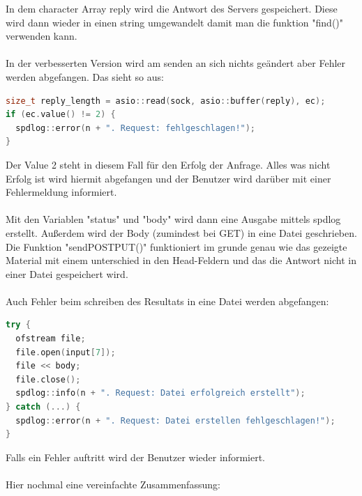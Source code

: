 \documentclass{article}
\begin{document}
In dem character Array reply wird die Antwort des Servers gespeichert. Diese wird dann wieder in einen string umgewandelt damit man die funktion "find()" verwenden kann.
\\
\\
In der verbesserten Version wird am senden an sich nichts geändert aber Fehler werden abgefangen. Das sieht so aus:
\begin{lstlisting}[language=C++]
size_t reply_length = asio::read(sock, asio::buffer(reply), ec);
if (ec.value() != 2) {
  spdlog::error(n + ". Request: fehlgeschlagen!");
}
\end{lstlisting}
Der Value 2 steht in diesem Fall für den Erfolg der Anfrage. Alles was nicht Erfolg ist wird hiermit abgefangen und der Benutzer wird darüber mit einer Fehlermeldung informiert.
\\
\\
Mit den Variablen "status" und "body" wird dann eine Ausgabe mittels spdlog erstellt. Außerdem wird der Body (zumindest bei GET) in eine Datei geschrieben. 
\\
Die Funktion "send\textunderscore POST\textunderscore PUT()" funktioniert im grunde genau wie das gezeigte Material mit einem unterschied in den Head-Feldern und das die Antwort nicht in einer Datei gespeichert wird.
\\
\\
Auch Fehler beim schreiben des Resultats in eine Datei werden abgefangen:
\begin{lstlisting}[language=C++]
try {
  ofstream file;
  file.open(input[7]);
  file << body;
  file.close();
  spdlog::info(n + ". Request: Datei erfolgreich erstellt");
} catch (...) {
  spdlog::error(n + ". Request: Datei erstellen fehlgeschlagen!");
}
\end{lstlisting}
Falls ein Fehler auftritt wird der Benutzer wieder informiert.
\\
\\
Hier nochmal eine vereinfachte Zusammenfassung:
\end{document}

